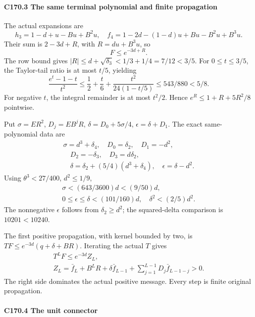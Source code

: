 \paragraph{C170.3 The same terminal polynomial and finite propagation}

The actual expansions are
\[
h_3=1-d+u-Bu+B^2u,
\quad f_4=1-2d-(1-d)u+Bu-B^2u+B^3u.
\]
Their sum is \(2-3d+R\), with \(R=du+B^3u\), so
\[
F\le e^{-3d+R}.                                      \tag{C170.T178.8}
\]
The row bound gives \(|R|\le d+\sqrt{\delta_3}<1/3+1/4=7/12<3/5\). For \(0\le t\le3/5\), the Taylor-tail ratio is at most \(t/5\), yielding
\[
\frac{e^t-1-t}{t^2}\le\frac12+\frac t6+
\frac{t^2}{24(1-t/5)}\le543/880<5/8.
\]
For negative \(t\), the integral remainder is at most \(t^2/2\). Hence \(e^R\le1+R+5R^2/8\) pointwise.

Put \(\sigma=ER^2\), \(D_j=EB^jR\), \(\delta=D_0+5\sigma/4\), \(\epsilon=\delta+D_1\). The exact same-polynomial data are
\[
\begin{gathered}
\sigma=d^3+\delta_4,\quad D_0=\delta_2,\quad D_1=-d^2,\\
\quad D_2=-\delta_3,\quad D_3=d\delta_2,\\
\quad \delta=\delta_2+(5/4)(d^3+\delta_4),\quad \epsilon=\delta-d^2.
\end{gathered}\tag{C170.T178.9}
\]
Using \(\theta^3<27/400\), \(d^2\le1/9\),
\[
\begin{gathered}
\sigma<(643/3600)d<(9/50)d,\quad\\
0\le\epsilon\le\delta<(101/160)d,\quad\delta^2<(2/5)d^2.
\end{gathered}\tag{C170.T178.10}
\]
The nonnegative \(\epsilon\) follows from \(\delta_2\ge d^2\); the squared-delta comparison is \(10201<10240\).

The first positive propagation, with kernel bounded by two, is \(TF\le e^{-3d}(q+\delta+BR)\). Iterating the actual \(T\) gives
\[
\begin{gathered}
T^LF\le e^{-3d}Z_L,\quad\\
Z_L=\bar f_L+B^LR+\delta \bar f_{L-1}+\sum_{j=1}^{L-1}D_j\bar f_{L-1-j}>0.
\end{gathered}\tag{C170.T178.11}
\]
The right side dominates the actual positive message. Every step is finite original propagation.

\paragraph{C170.4 The unit connector}

